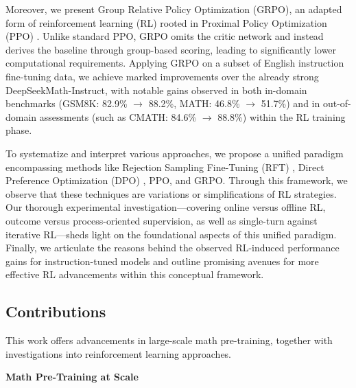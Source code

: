 Moreover, we present Group Relative Policy Optimization (GRPO), an adapted form of reinforcement learning (RL) rooted in Proximal Policy Optimization (PPO) \citep{schulman2017proximal}. Unlike standard PPO, GRPO omits the critic network and instead derives the baseline through group-based scoring, leading to significantly lower computational requirements. Applying GRPO on a subset of English instruction fine-tuning data, we achieve marked improvements over the already strong DeepSeekMath-Instruct, with notable gains observed in both in-domain benchmarks (GSM8K: 82.9\% $\rightarrow$ 88.2\%, MATH: 46.8\% $\rightarrow$ 51.7\%) and in out-of-domain assessments (such as CMATH: 84.6\% $\rightarrow$ 88.8\%) within the RL training phase. 

To systematize and interpret various approaches, we propose a unified paradigm encompassing methods like Rejection Sampling Fine-Tuning (RFT) \citep{yuan2023scaling}, Direct Preference Optimization (DPO) \citep{dpo}, PPO, and GRPO. Through this framework, we observe that these techniques are variations or simplifications of RL strategies. Our thorough experimental investigation—covering online versus offline RL, outcome versus process-oriented supervision, as well as single-turn against iterative RL—sheds light on the foundational aspects of this unified paradigm. Finally, we articulate the reasons behind the observed RL-induced performance gains for instruction-tuned models and outline promising avenues for more effective RL advancements within this conceptual framework.

\subsection{Contributions}
This work offers advancements in large-scale math pre-training, together with investigations into reinforcement learning approaches.

\textbf{Math Pre-Training at Scale}

